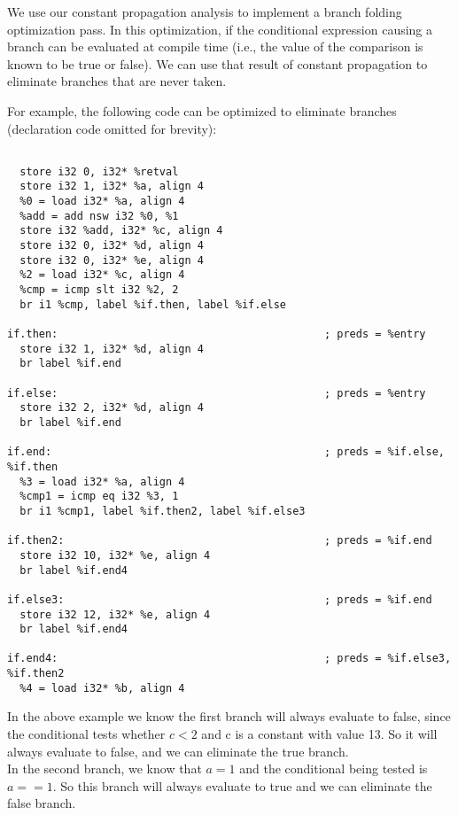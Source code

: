 We use our constant propagation analysis to implement a branch folding optimization pass. In this optimization, if the conditional expression causing a branch can be evaluated at compile time (i.e., the value of the comparison is known to be true or false). We can use that result of constant propagation to eliminate branches that are never taken. 

For example, the following code can be optimized to eliminate branches (declaration code omitted for brevity):

\begin{verbatim}

  store i32 0, i32* %retval
  store i32 1, i32* %a, align 4
  %0 = load i32* %a, align 4
  %add = add nsw i32 %0, %1
  store i32 %add, i32* %c, align 4
  store i32 0, i32* %d, align 4
  store i32 0, i32* %e, align 4
  %2 = load i32* %c, align 4
  %cmp = icmp slt i32 %2, 2
  br i1 %cmp, label %if.then, label %if.else

if.then:                                          ; preds = %entry
  store i32 1, i32* %d, align 4
  br label %if.end

if.else:                                          ; preds = %entry
  store i32 2, i32* %d, align 4
  br label %if.end

if.end:                                           ; preds = %if.else, %if.then
  %3 = load i32* %a, align 4
  %cmp1 = icmp eq i32 %3, 1
  br i1 %cmp1, label %if.then2, label %if.else3

if.then2:                                         ; preds = %if.end
  store i32 10, i32* %e, align 4
  br label %if.end4

if.else3:                                         ; preds = %if.end
  store i32 12, i32* %e, align 4
  br label %if.end4

if.end4:                                          ; preds = %if.else3, %if.then2
  %4 = load i32* %b, align 4
\end{verbatim}

In the above example we know the first branch will always evaluate to false, since the conditional tests whether $c < 2$ and c is a constant with value 13. So it will always evaluate to false, and we can eliminate the true branch.\\

In the second branch, we know that $a = 1$ and the conditional being tested is $a==1$. So this branch will always evaluate to true and we can eliminate the false branch. \\

